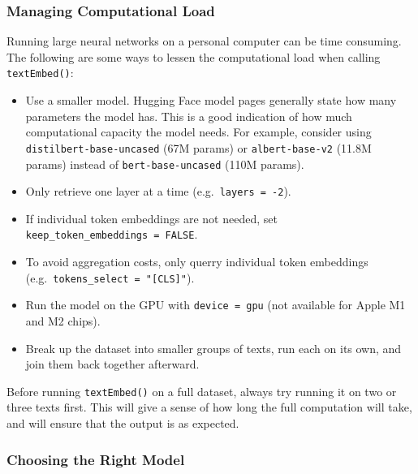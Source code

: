 \documentclass[
  man,
  floatsintext,
  longtable,
  nolmodern,
  notxfonts,
  notimes,
  colorlinks=true,linkcolor=blue,citecolor=blue,urlcolor=blue]{apa7}
\providecommand{\tightlist}{%
  \setlength{\itemsep}{0pt}\setlength{\parskip}{0pt}}
\begin{document}
\subsubsection{Managing Computational
Load}\label{managing-computational-load}

Running large neural networks on a personal computer can be time
consuming. The following are some ways to lessen the computational load
when calling \texttt{textEmbed()}:

\begin{itemize}
\tightlist
\item
  Use a smaller model. Hugging Face model pages generally state how many
  parameters the model has. This is a good indication of how much
  computational capacity the model needs. For example, consider using
  \texttt{distilbert-base-uncased} (67M params) or
  \texttt{albert-base-v2} (11.8M params) instead of
  \texttt{bert-base-uncased} (110M params).
\item
  Only retrieve one layer at a time (e.g.~\texttt{layers\ =\ -2}).
\item
  If individual token embeddings are not needed, set
  \texttt{keep\_token\_embeddings\ =\ FALSE}.
\item
  To avoid aggregation costs, only querry individual token embeddings
  (e.g.~\texttt{tokens\_select\ =\ "{[}CLS{]}"}).
\item
  Run the model on the GPU with
  \texttt{device\ =\ \textquotesingle{}gpu\textquotesingle{}} (not
  available for Apple M1 and M2 chips).
\item
  Break up the dataset into smaller groups of texts, run each on its
  own, and join them back together afterward.
\end{itemize}

Before running \texttt{textEmbed()} on a full dataset, always try
running it on two or three texts first. This will give a sense of how
long the full computation will take, and will ensure that the output is
as expected.

\subsubsection{Choosing the Right Model}\label{choosing-the-right-model}
\end{document}
